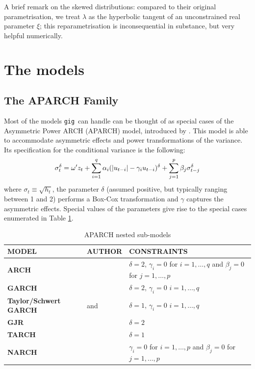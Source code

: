 \documentclass[a4paper,11pt]{article}
\newcommand{\uhat}{\ensuremath u}
\newcommand{\gig}{\texttt{gig}}
\begin{document}
A brief remark on the skewed distributions: compared to their original
parametrisation, we treat $\lambda$ as the hyperbolic tangent of an
unconstrained real parameter $\xi$; this reparametrisation is
inconsequential in substance, but very helpful numerically.

\section{The models}
\label{sec:models}

\subsection{The APARCH Family}
\label{sec:APARCH}

Most of the models \gig\ can handle can be thought of as special
cases of the Asymmetric Power ARCH (APARCH) model, introduced by
\cite{Ding-Engle-Granger}. This model is able to accommodate
asymmetric effects and power transformations of the variance. Its
specification for the conditional variance is the following:
\begin{equation} \label{eq:aparch} \sigma_t^\delta = \omega'z_t +
  \sum_{i=1}^q \alpha_i(|\uhat_{t-i}| - \gamma_i
  \uhat_{t-i})^\delta + \sum_{j=1}^p\beta_j\sigma_{t-j}^\delta
\end{equation}
where $\sigma_t \equiv \sqrt{h_t}$, the parameter $\delta$ (assumed
positive, but typically ranging between 1 and 2) performs a Box-Cox
transformation and $\gamma$ captures the asymmetric effects.  Special
values of the parameters give rise to the special cases enumerated in
Table \ref{tab:APARCH-submodels}.

\begin{table}[hptb]
  \centering
  \begin{tabular}{p{}p{}p{}}
    \hline
    MODEL & AUTHOR & CONSTRAINTS \\
    \hline
    \textbf{ARCH} & \cite{Engle-82} & $\delta=2$, $\gamma_i = 0$ for
 $ i=1,\ldots,q$ and $\beta_j = 0$ for $j=1,\ldots,p$ \\
 \hline
 \textbf{GARCH} & \cite{Bollerslev-86} & $\delta=2$,
  $\gamma_i = 0$ $ i=1,\ldots,q$ \\
  \hline
  \textbf{Taylor/Schwert GARCH} & \cite{Taylor} and \cite{Schwert} & $\delta=1$,
  $\gamma_i = 0$ $ i=1,\ldots,q$\\
  \hline
  \textbf{GJR} & \cite{Glosten-Jagannathan-Runkle} & $\delta=2$ \\
  \hline
  \textbf{TARCH} & \cite{Zakoian} & $\delta=1$\\
  \hline
  \textbf{NARCH} & \cite{Higgins-Bera} & $\gamma_i = 0$ for
  $ i=1,\ldots,p$ and $\beta_j = 0$ for $j=1,\ldots,p$\\
  \hline  
  \end{tabular}
  \caption{APARCH nested sub-models}
  \label{tab:APARCH-submodels}
\end{table}
\end{document}

